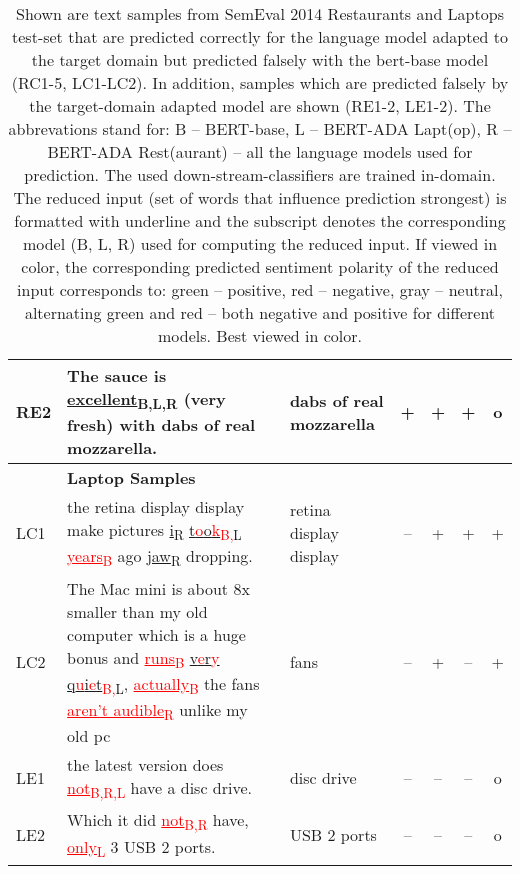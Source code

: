 \documentclass[11pt,a4paper]{article}
\newcommand{\ipr}[2]{\underline{#1}\textsubscript{\tiny{#2}}}
\newcommand{\ripr}[2]{\textcolor{red}{\underline{#1}\textsubscript{\tiny{#2}}}}
\newcommand{\gipr}[2]{\textcolor{jade}{\underline{#1}\textsubscript{\tiny{#2}}}}
\newcommand{\rc}[1]{\textcolor{red}{#1}}
\newcommand{\gc}[1]{\textcolor{jade}{#1}}
\begin{document}
\begin{table*}[h!]
\begin{center}
{\begin{tabular}{lp{9.0cm}p{2.0cm}cccc}
RE2 & The sauce is \gipr{excellent}{B,L,R} (very fresh) with dabs of real mozzarella. & dabs of real mozzarella & + & + & + & o \\ \midrule

 & \textbf{Laptop Samples} & &  & & & \\ \midrule



LC1 & the retina display display make pictures \gipr{i}{R} \ipr{\gc{t}\rc{o}\gc{o}\rc{k}}{\rc{B,}\gc{L}} \ripr{years}{B} ago \gipr{jaw}{R} dropping. & retina display display & -- & + & + & + \\

LC2 & The Mac mini is about 8x smaller than my old computer which is a huge bonus and \ripr{runs}{B} \ipr{\gc{v}\rc{e}\gc{r}\rc{y} \gc{q}\rc{u}\gc{i}\rc{e}\gc{t}}{\rc{B,}\gc{L}}, \ripr{actually}{B} the fans \ripr{aren't audible}{R} unlike my old pc & fans & -- & + & -- & + \\ \midrule



LE1 & the latest version does \ripr{not}{B,R,L} have a disc drive. & disc drive & -- & -- & -- & o \\ 


LE2 &  Which it did \ripr{not}{B,R} have, \ripr{only}{L} 3 USB 2 ports. & USB 2 ports & -- & -- & -- & o \\



\end{tabular}
}
\end{center}
\caption{
Shown are text samples from SemEval 2014 Restaurants and Laptops test-set that are  predicted correctly for the language model adapted to the target domain but  predicted falsely with the bert-base model (RC1-5, LC1-LC2). In addition, samples which are  predicted falsely by the target-domain adapted model are shown (RE1-2, LE1-2).
The abbrevations stand for: B -- BERT-base, L -- BERT-ADA Lapt(op), R -- BERT-ADA Rest(aurant) -- all the language models used for prediction. The used down-stream-classifiers are trained in-domain.
The reduced input (set of words that influence prediction strongest) is formatted with underline and the subscript denotes the corresponding model (B, L, R) used for computing the reduced input. If viewed in color, the corresponding predicted sentiment polarity of the reduced input corresponds to: green -- positive, red -- negative, gray -- neutral, alternating green and red -- both negative and positive for different models.
Best viewed in color.
}\label{tab:casestudy}
\end{table*}
\end{document}
